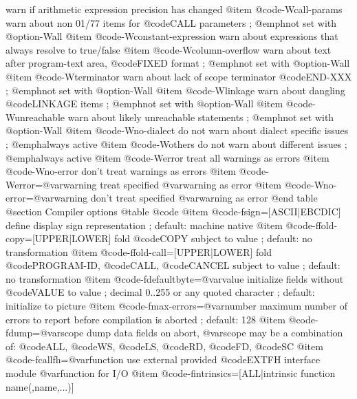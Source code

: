 warn if arithmetic expression precision has changed
@item @code{-Wcall-params}
warn about non 01/77 items for @code{CALL} parameters
; @emph{not set with @option{-Wall}}
@item @code{-Wconstant-expression}
warn about expressions that always resolve to true/false
@item @code{-Wcolumn-overflow}
warn about text after program-text area, @code{FIXED} format
; @emph{not set with @option{-Wall}}
@item @code{-Wterminator}
warn about lack of scope terminator @code{END-XXX}
; @emph{not set with @option{-Wall}}
@item @code{-Wlinkage}
warn about dangling @code{LINKAGE} items
; @emph{not set with @option{-Wall}}
@item @code{-Wunreachable}
warn about likely unreachable statements
; @emph{not set with @option{-Wall}}
@item @code{-Wno-dialect}
do not warn about dialect specific issues
; @emph{always active}
@item @code{-Wothers}
do not warn about different issues
; @emph{always active}
@item @code{-Werror}
treat all warnings as errors
@item @code{-Wno-error}
don't treat warnings as errors
@item @code{-Werror=@var{warning}}
treat specified @var{warning} as error
@item @code{-Wno-error=@var{warning}}
don't treat specified @var{warning} as error
@end table
@section Compiler options
@table @code
@item @code{-fsign=[ASCII|EBCDIC]}
define display sign representation
; default: machine native
@item @code{-ffold-copy=[UPPER|LOWER]}
fold @code{COPY} subject to value
; default: no transformation
@item @code{-ffold-call=[UPPER|LOWER]}
fold @code{PROGRAM-ID}, @code{CALL}, @code{CANCEL} subject to value
; default: no transformation
@item @code{-fdefaultbyte=@var{value}}
initialize fields without @code{VALUE} to value
; decimal 0..255 or any quoted character
; default: initialize to picture
@item @code{-fmax-errors=@var{number}}
maximum number of errors to report before
compilation is aborted
; default: 128
@item @code{-fdump=@var{scope}}
dump data fields on abort, @var{scope} may be
a combination of: @code{ALL}, @code{WS}, @code{LS}, @code{RD}, @code{FD}, @code{SC}
@item @code{-fcallfh=@var{function}}
use external provided @code{EXTFH} interface module
@var{function} for I/O
@item @code{-fintrinsics=[ALL|intrinsic function name(,name,...)]}

